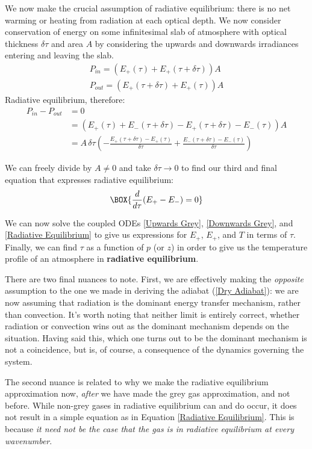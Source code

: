 We now make the crucial assumption of radiative equilibrium: there is no net warming or heating from radiation at each optical depth. We now consider conservation of energy on some infinitesimal slab of atmosphere with optical thickness $\delta \tau$ and area $A$ by considering the upwards and downwards irradiances entering and leaving the slab. 
\begin{align*}
    P_{in}=(E_+(\tau)+E_+(\tau+\delta\tau))A\\
    P_{out}=(E_+(\tau+\delta\tau)+E_+(\tau))A
\end{align*}
Radiative equilibrium, therefore:
\begin{align*}
    P_{in}-P_{out}&=0\\
    &= (E_+(\tau)+E_-(\tau+\delta\tau)-E_+(\tau+\delta\tau)-E_-(\tau))A\\
    &=A\,\delta\tau
    \left(-
    \frac{E_+(\tau+\delta\tau)-E_+(\tau)}{\delta \tau}
    +
    \frac{E_-(\tau+\delta\tau)-E_-(\tau)}{\delta \tau}
    \right)
\end{align*}

We can freely divide by $A\neq0$ and take $\delta\tau\to0$ to find our third and final equation that expresses radiative equilibrium:
\begin{align}\label{Radiative Equilibrium}
    \BOX{\frac{d}{d\tau}(E_+-E_-)=0}
\end{align}

We can now solve the coupled ODEs \ref{Upwards Grey}, \ref{Downwards Grey}, and \ref{Radiative Equilibrium} to give us expressions for $E_+$, $E_+$, and $T$ in terms of $\tau$. Finally, we can find $\tau$ as a function of $p$ (or $z$) in order to give us the temperature profile of an atmosphere in \textbf{radiative equilibrium}. 

There are two final nuances to note. First, we are effectively making the \textit{opposite} assumption to the one we made in deriving the adiabat (\ref{Dry Adiabat}): we are now assuming that radiation is the dominant energy transfer mechanism, rather than convection. It's worth noting that neither limit is entirely correct, whether radiation or convection wins out as the dominant mechanism depends on the situation. Having said this, which one turns out to be the dominant mechanism is not a coincidence, but is, of course, a consequence of the dynamics governing the system.

The second nuance is related to why we make the radiative equilibrium approximation now, \textit{after} we have made the grey gas approximation, and not before. While non-grey gases in radiative equilibrium can and do occur, it does not result in a simple equation as in Equation \ref{Radiative Equilibrium}. This is because \textit{it need not be the case that the gas is in radiative equilibrium at every wavenumber}. 


